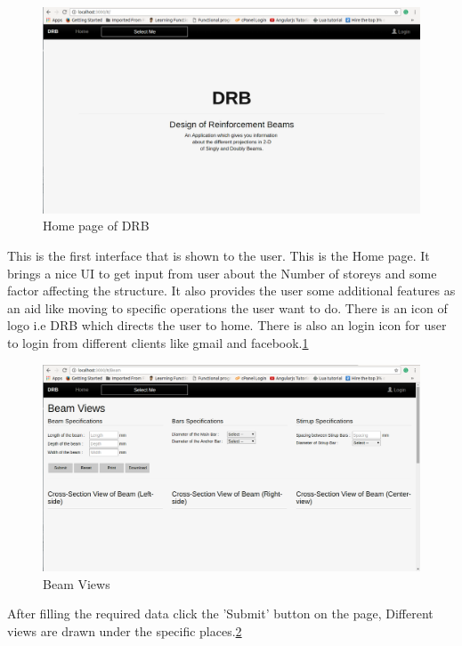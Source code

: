 \begin{figure}[H] 
\centering \includegraphics[scale=0.32]{images/output/screen1.png}
\caption{Home page of DRB}
\label{fig:1}
\end{figure}
This is the first interface that is shown to the user. This is the Home page.
It brings a nice UI to get input from user about the Number of storeys and 
some factor affecting the structure. It also provides the user some 
additional features as an aid like moving to specific operations the user want to do. There is an icon of logo i.e DRB which directs the user to home. There is also an login icon for user to login from different clients like gmail and facebook.\ref{fig:1}
\begin{figure}[H] 
\centering \includegraphics[scale=0.32]{images/output/screen2.png}
\caption{Beam Views}
\label{fig:2}
\end{figure}  


After filling the required data click the 'Submit' button on the page, Different views are drawn under the specific places.\ref{fig:2}

